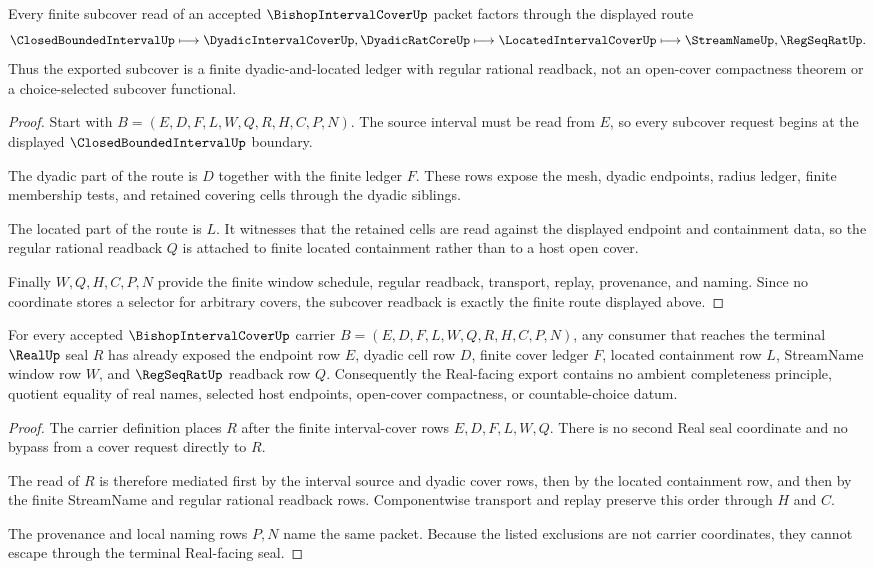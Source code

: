 \begin{theorem}
\label{thm:bishop-interval-cover-dyadic-subcover-readback}
Every finite subcover read of an accepted $\BishopIntervalCoverUp$ packet factors through the displayed route
$$
\ClosedBoundedIntervalUp \longmapsto \DyadicIntervalCoverUp,\DyadicRatCoreUp \longmapsto \LocatedIntervalCoverUp \longmapsto \StreamNameUp,\RegSeqRatUp .
$$
Thus the exported subcover is a finite dyadic-and-located ledger with regular rational readback, not an open-cover compactness theorem or a choice-selected subcover functional.
\end{theorem}
\begin{proof}
Start with $B=(E,D,F,L,W,Q,R,H,C,P,N)$. The source interval must be read from $E$, so every subcover request begins at the displayed $\ClosedBoundedIntervalUp$ boundary.

The dyadic part of the route is $D$ together with the finite ledger $F$. These rows expose the mesh, dyadic endpoints, radius ledger, finite membership tests, and retained covering cells through the dyadic siblings.

The located part of the route is $L$. It witnesses that the retained cells are read against the displayed endpoint and containment data, so the regular rational readback $Q$ is attached to finite located containment rather than to a host open cover.

Finally $W,Q,H,C,P,N$ provide the finite window schedule, regular readback, transport, replay, provenance, and naming. Since no coordinate stores a selector for arbitrary covers, the subcover readback is exactly the finite route displayed above.
\end{proof}

\begin{theorem}
\label{thm:bishop-interval-cover-real-seal-nonescape}
For every accepted $\BishopIntervalCoverUp$ carrier $B=(E,D,F,L,W,Q,R,H,C,P,N)$, any consumer that reaches the terminal $\RealUp$ seal $R$ has already exposed the endpoint row $E$, dyadic cell row $D$, finite cover ledger $F$, located containment row $L$, StreamName window row $W$, and $\RegSeqRatUp$ readback row $Q$. Consequently the Real-facing export contains no ambient completeness principle, quotient equality of real names, selected host endpoints, open-cover compactness, or countable-choice datum.
\end{theorem}
\begin{proof}
The carrier definition places $R$ after the finite interval-cover rows $E,D,F,L,W,Q$. There is no second Real seal coordinate and no bypass from a cover request directly to $R$.

The read of $R$ is therefore mediated first by the interval source and dyadic cover rows, then by the located containment row, and then by the finite StreamName and regular rational readback rows. Componentwise transport and replay preserve this order through $H$ and $C$.

The provenance and local naming rows $P,N$ name the same packet. Because the listed exclusions are not carrier coordinates, they cannot escape through the terminal Real-facing seal.
\end{proof}

